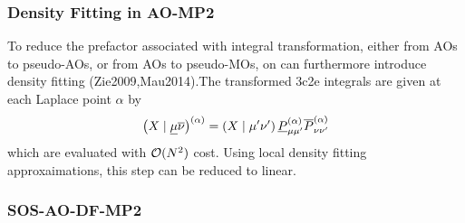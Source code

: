 
\subsubsection{Density Fitting in AO-MP2}

To reduce the prefactor associated with integral transformation, either from AOs to pseudo-AOs, or from AOs to pseudo-MOs, on can furthermore introduce density fitting (Zie2009,Mau2014).The transformed 3c2e integrals are given at each Laplace point $\alpha$ by
\begin{equation}
\left( X \mid \underline{\mu}\overline{\nu} \right)^{(\alpha)} = \left( X \mid \mu'\nu' \right) \underline{P}^{(\alpha)}_{\mu\mu'} \overline{P}^{(\alpha)}_{\nu\nu'}  
\end{equation}
\noindent which are evaluated with $\mathcal{O}(N^{2})$ cost. Using local density fitting approxaimations, this step can be reduced to linear. 

\subsubsection{SOS-AO-DF-MP2}

